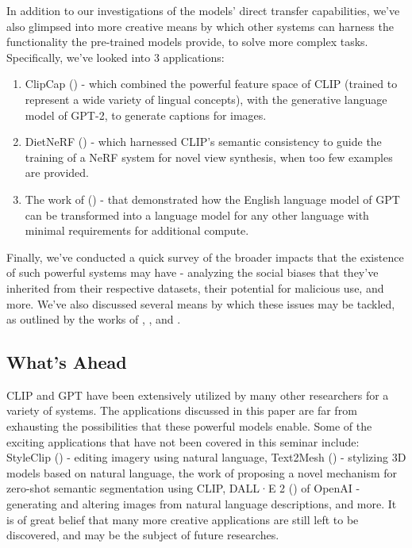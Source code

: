 \documentclass{article}
\begin{document}
\noindent
In addition to our investigations of the models' direct transfer capabilities, we've also glimpsed into more creative means by which other systems can harness the functionality the pre-trained models provide, to solve more complex tasks. Specifically, we've looked into 3 applications:
\begin{enumerate}
    \item
        ClipCap (\citet{mokady2021clipcap}) - which combined the powerful feature space of CLIP (trained to represent a wide variety of lingual concepts), with the generative language model of GPT-2, to generate captions for images.
    \item
        DietNeRF (\citet{Jain_2021_dietnerf}) - which harnessed CLIP's semantic consistency to guide the training of a NeRF system for novel view synthesis, when too few examples are provided.
    \item
        The work of (\citet{deVries2020recycle}) - that demonstrated how the English language model of GPT can be transformed into a language model for any other language with minimal requirements for additional compute.
\end{enumerate}

\noindent
Finally, we've conducted a quick survey of the broader impacts that the existence of such powerful systems may have - analyzing the social biases that they've inherited from their respective datasets, their potential for malicious use, and more. We've also discussed several means by which these issues may be tackled, as outlined by the works of \citet{radford2021clip}, \citet{brown2020gpt3}, and \citet{tamkin2021convention}.



\subsection{What's Ahead}
\label{sec:whats_left}

CLIP and GPT have been extensively utilized by many other researchers for a variety of systems. The applications discussed in this paper are far from exhausting the possibilities that these powerful models enable. Some of the exciting applications that have not been covered in this seminar include: StyleClip (\citet{patashnik2021styleclip}) - editing imagery using natural language, Text2Mesh (\citet{text2mesh}) - stylizing 3D models based on natural language, the work of \citet{zs-segmentation} proposing a novel mechanism for zero-shot semantic segmentation using CLIP, DALL·E 2 (\citet{dalle2}) of OpenAI - generating and altering images from natural language descriptions, and more. It is of great belief that many more creative applications are still left to be discovered, and may be the subject of future researches.
\end{document}

